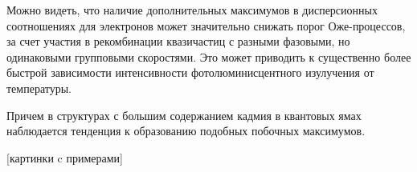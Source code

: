 \begin{figure}[h!]
\begin{minipage}[h]{0.3\linewidth}
\begin{center}
                \end{center}
            \end{minipage}
        \end{figure}

        Можно видеть, что наличие дополнительных максимумов в дисперсионных соотношениях для электронов
        может значительно снижать порог Оже-процессов, за счет участия в рекомбинации квазичастиц с разными фазовыми,
        но одинаковыми групповыми скоростями. Это может приводить к существенно более быстрой зависимости
        интенсивности фотолюминисцентного изулучения от температуры.

        Причем в структурах с большим содержанием кадмия в квантовых ямах наблюдается тенденция к образованию
        подобных побочных максимумов. 


        [картинки c примерами]
    \newpage
